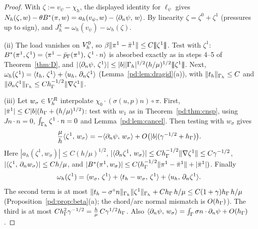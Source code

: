 \begin{proof}
With $\zeta:=v_\psi-\chi_h$, the displayed identity for $\ell_\psi$ gives $N_h(\zeta,w)-\theta B^\ast(\pi,w)=a_h(v_\psi,w)-\langle \partial_n\psi,\, w\rangle$. By linearity $\zeta=\zeta^0+\zeta^1$ (pressures up to sign), and $J^\chi_h=\omega_h(v_\psi)-\omega_h(\zeta)$.

(ii) The load vanishes on $V_h^0$, so $\beta\lVert \pi^1-\bar\pi^1\rVert\le C|\!|\!|\zeta^1|\!|\!|$. Test with $\zeta^1$: $B^\ast(\pi^1,\zeta^1)=\langle \pi^1-\bar p_{\Gamma}(\pi^1),\, \zeta^1\cdot n\rangle$ is absorbed exactly as in steps 4--5 of Theorem~\ref{thm:D}, and $|\langle \partial_n\psi,\, \zeta^1\rangle|\le|b||\Gamma_h|^{1/2}(h/\mu)^{1/2}|\!|\!|\zeta^1|\!|\!|$. Next, $\omega_h(\zeta^1)=\langle t_h,\, \zeta^1\rangle+\langle u_h,\, \partial_n\zeta^1\rangle$ (Lemma~\ref{pd:lem:dragid}(a)), with $\lVert t_h\rVert_{\Gamma_h}\le C$ and $\lVert \partial_n\zeta^1\rVert_{\Gamma_h}\le Ch_\Gamma^{-1/2}\lVert \nabla\zeta^1\rVert$.

(iii) Let $w_\sigma\in V_h^R$ interpolate $\chi_0\cdot(\sigma(u,p)n)\circ\pi$. First, $|\bar\pi^1|\le C|b|(h_\Gamma+(h/\mu)^{1/2})$: test with $w_1$ as in Theorem~\ref{pd:thm:cnsp}, using $Jn\cdot n=0$, $\int_{\Gamma_h}\zeta^1\cdot n=0$ and Lemma~\ref{pd:lem:cancel}. Then testing with $w_\sigma$ gives
\[
\frac\mu h\langle \zeta^1,\, w_\sigma\rangle=-\langle \partial_n\psi,\, w_\sigma\rangle+O\bigl(|b|(\gamma^{-1/2}+h_\Gamma)\bigr).
\]
Here $|a_h(\zeta^1,w_\sigma)|\le C(h/\mu)^{1/2}$, $|\langle \partial_n\zeta^1,\, w_\sigma\rangle|\le Ch_\Gamma^{-1/2}\lVert \nabla\zeta^1\rVert\le C\gamma^{-1/2}$, $|\langle \zeta^1,\, \partial_n w_\sigma\rangle|\le Ch/\mu$, and $|B^\ast(\pi^1,w_\sigma)|\le C(h_\Gamma^{-1/2}\lVert \pi^1-\bar\pi^1\rVert+|\bar\pi^1|)$. Finally
\[
\omega_h(\zeta^1)=\langle w_\sigma,\, \zeta^1\rangle+\langle t_h-w_\sigma,\, \zeta^1\rangle+\langle u_h,\, \partial_n\zeta^1\rangle.
\]
The second term is at most $\lVert t_h-\sigma^\circ n\rVert_{\Gamma_h}\lVert \zeta^1\rVert_{\Gamma_h}+Ch_\Gamma\,h/\mu\le C(1+\gamma)h_\Gamma\,h/\mu$ (Proposition~\ref{pd:prop:beta}(a); the chord/arc normal mismatch is $O(h_\Gamma)$). The third is at most $Ch_\Gamma^2\gamma^{-1/2}=\frac h\mu\,C\gamma^{1/2}h_\Gamma$. Also $\langle \partial_n\psi,\, w_\sigma\rangle=\int_\Gamma\sigma n\cdot\partial_n\psi+O(h_\Gamma)$.
\end{proof}

